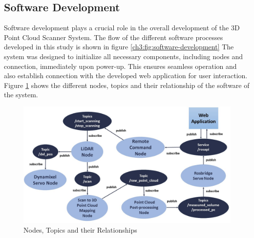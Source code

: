


\subsection{Software Development}
\label{ch3:subsec:software-development}

Software development plays a crucial role in the overall development of the 3D Point Cloud Scanner System. The flow of the different software processes developed in this study is shown in figure \ref{ch3:fig:software-development}  The system was designed to initialize all necessary components, including nodes and connection, immediately upon power-up. This ensures seamless operation and also establish connection with the developed web application for user interaction. Figure \ref{ch3:fig:nodes-topics-relationships} shows the different nodes, topics and their relationship of the software of the system. \\

\begin{figure}[H]
	\centering
	\includegraphics[width=1\textwidth]{Figures/nodes-topics-relationship}
	\caption{Nodes, Topics and their Relationships}
	\label{ch3:fig:nodes-topics-relationships}
\end{figure}

